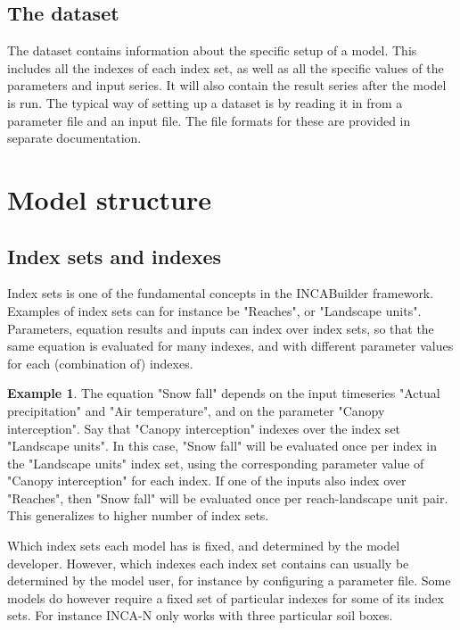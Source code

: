 \documentclass[11pt]{article}
\theoremstyle{definition}
\newtheorem{myexample}{Example}
\newenvironment{example}%
  {\begin{lrbox}{\examplebox}%
   \begin{minipage}{\dimexpr\linewidth-2\fboxsep}
   \begin{myexample}}%
  {\end{myexample}%
   \end{minipage}%
   \end{lrbox}%
   \begin{trivlist}
     \item[]\colorbox{silver}{\usebox\examplebox}
   \end{trivlist}}
\begin{document}
\subsection{The dataset}

The dataset contains information about the specific setup of a model. This includes all the indexes of each index set, as well as all the specific values of the parameters and input series. It will also contain the result series after the model is run. The typical way of setting up a dataset is by reading it in from a parameter file and an input file. The file formats for these are provided in separate documentation.

\section{Model structure}

\subsection{Index sets and indexes}

Index sets is one of the fundamental concepts in the INCABuilder framework. Examples of index sets can for instance be "Reaches", or "Landscape units". Parameters, equation results and inputs can index over index sets, so that the same equation is evaluated for many indexes, and with different parameter values for each (combination of) indexes.

\begin{example}
The equation "Snow fall" depends on the input timeseries "Actual precipitation" and "Air temperature", and on the parameter "Canopy interception". Say that "Canopy interception" indexes over the index set "Landscape units". In this case, "Snow fall" will be evaluated once per index in the "Landscape units" index set, using the corresponding parameter value of "Canopy interception" for each index. If one of the inputs also index over "Reaches", then "Snow fall" will be evaluated once per reach-landscape unit pair. This generalizes to higher number of index sets.
\end{example}

Which index sets each model has is fixed, and determined by the model developer. However, which indexes each index set contains can usually be determined by the model user, for instance by configuring a parameter file. Some models do however require a fixed set of particular indexes for some of its index sets. For instance INCA-N only works with three particular soil boxes.
\end{document}
